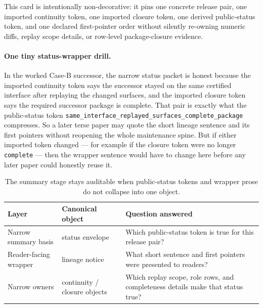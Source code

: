 \documentclass[11pt]{article}
\begin{document}
This card is intentionally non-decorative: it pins one concrete release pair, one imported continuity token, one imported closure token, one derived public-status token, and one declared first-pointer order without silently re-owning numeric diffs, replay scope details, or row-level package-closure evidence.\cite{series:workedexample}

\paragraph{One tiny status-wrapper drill.}
In the worked Case-B successor, the narrow status packet is honest because the imported continuity token says the successor stayed on the same certified interface after replaying the changed surfaces, and the imported closure token says the required successor package is complete. That pair is exactly what the public-status token \texttt{same\_interface\_replayed\_surfaces\_complete\_package} compresses. So a later terse paper may quote the short lineage sentence and its first pointers without reopening the whole maintenance spine. But if either imported token changed --- for example if the closure token were no longer \texttt{complete} --- then the wrapper sentence would have to change here before any later paper could honestly reuse it.\cite{series:workedexample}

\begin{table}[t]
\centering
\small
\begin{tabularx}{\linewidth}{@{}l l X@{}}
\toprule
Layer & Canonical object & Question answered \\
\midrule
Narrow summary basis & status envelope & Which public-status token is true for this release pair? \\
Reader-facing wrapper & lineage notice & What short sentence and first pointers were presented to readers? \\
Narrow owners & continuity / closure objects & Which replay scope, role rows, and completeness details make that status true? \\
\bottomrule
\end{tabularx}
\caption{The summary stage stays auditable when public-status tokens and wrapper prose do not collapse into one object.}
\label{tab:statussplit}
\end{table}
\end{document}
